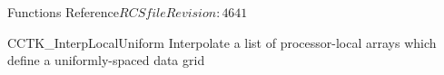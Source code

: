 \begin{cactuspart}{ Functions Reference}{$RCSfile$}{$Revision: 4641 $}


\begin{FunctionDescription}{CCTK\_InterpLocalUniform}
\label{CCTK-InterpLocalUniform}
Interpolate a list of processor-local arrays
which define a uniformly-spaced data grid


\end{FunctionDescription}
\end{cactuspart}
